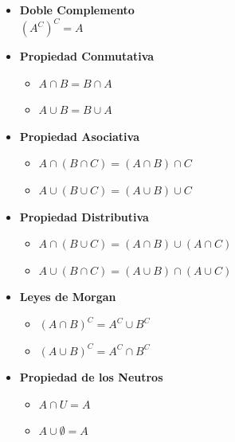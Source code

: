 \documentclass[12pt, fleqn]{report}                             %
\theoremstyle{break}                                            %
\begin{document}
            \begin{itemize}
                \item \textbf{Doble Complemento} \\
                        $(A^C)^C = A$

                \item \textbf{Propiedad Conmutativa}
                    \begin{itemize}
                        \item $A \cap B = B \cap A$
                        \item $A \cup B = B \cup A$
                    \end{itemize}

                \item \textbf{Propiedad Asociativa}
                    \begin{itemize}
                        \item $A \cap (B \cap C) = (A \cap B) \cap C$
                        \item $A \cup (B \cup C) = (A \cup B) \cup C$
                    \end{itemize}

                \item \textbf{Propiedad Distributiva}
                    \begin{itemize}
                        \item $A \cap (B \cup C) = (A \cap B) \cup (A \cap C)$
                        \item $A \cup (B \cap C) = (A \cup B) \cap (A \cup C)$
                    \end{itemize}

                \item \textbf{Leyes de Morgan}
                    \begin{itemize}
                        \item $(A \cap B)^C = A^C \cup B^C$
                        \item $(A \cup B)^C = A^C \cap B^C$
                    \end{itemize}

                \clearpage

                \item \textbf{Propiedad de los Neutros}
                    \begin{itemize}
                        \item $A \cap U = A$
                        \item $A \cup \emptyset = A$
                    \end{itemize}


\end{itemize}
\end{document}
